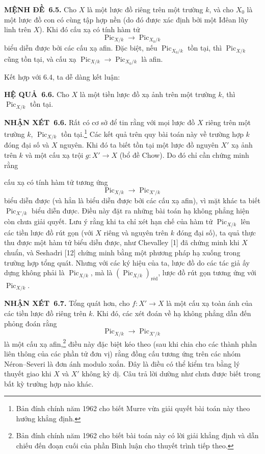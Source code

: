 \documentclass[11pt,twoside,openany]{book}
\numberwithin{equation}{section}
\newcommand{\src}[1]{%
  \phantomsection\hypertarget{src:\fgasourceid:#1}{}%
  \marginpar{\raggedleft\footnotesize\sffamily #1}%
}
\newcommand{\fgasourceid}{unset}
\newcommand{\result}[2]{\par\medskip\noindent\textbf{#1\if\relax\detokenize{#2}\relax\else\ #2\fi.}\quad}
\begin{document}
\result{MỆNH ĐỀ}{6.5} Cho $X$ là một lược đồ riêng trên một trường $k$, và cho
$X_0$ là một lược đồ con có cùng tập hợp nền (do đó được xác định bởi một Iđêan
lũy linh trên $X$). Khi đó cấu xạ có tính hàm tử
\[
\operatorname{Pic}_{X/k}\longrightarrow\operatorname{Pic}_{X_0/k}
\]
biểu diễn được bởi các cấu xạ afin. Đặc biệt, nếu
$\operatorname{Pic}_{X_0/k}$ tồn tại, thì $\operatorname{Pic}_{X/k}$ cũng tồn
tại, và cấu xạ
$\operatorname{Pic}_{X/k}\longrightarrow\operatorname{Pic}_{X_0/k}$ là afin.

Kết hợp với 6.4, ta dễ dàng kết luận:

\result{HỆ QUẢ}{6.6} Cho $X$ là một tiền lược đồ xạ ảnh trên một trường $k$,
thì $\operatorname{Pic}_{X/k}$ tồn tại.

\result{NHẬN XÉT}{6.6} Rất có cơ sở để tin rằng với mọi lược đồ $X$ riêng trên
một trường $k$, $\operatorname{Pic}_{X/k}$ tồn tại.\footnote{Bản đính chính năm
1962 cho biết Murre vừa giải quyết bài toán này theo hướng khẳng định.} Các kết quả trên
quy bài toán này về trường hợp $k$ đóng đại số và $X$ nguyên. Khi đó ta biết
tồn tại một lược đồ nguyên $X'$ xạ ảnh trên $k$ và một cấu xạ trội
$g:X'\longrightarrow X$ (bổ đề Chow). Do đó chỉ cần chứng minh rằng
\src{160}
cấu xạ có tính hàm tử tương ứng
\[
\operatorname{Pic}_{X/k}\longrightarrow\operatorname{Pic}_{X'/k}
\]
biểu diễn được (và hẳn là biểu diễn được bởi các cấu xạ afin), vì mặt khác ta
biết $\operatorname{Pic}_{X'/k}$ biểu diễn được. Điều này đặt ra những bài toán
hạ không phẳng hiện còn chưa giải quyết. Lưu ý rằng khi ta chỉ xét hạn chế của
hàm tử $\operatorname{Pic}_{X/k}$ lên các tiền lược đồ rút gọn (với $X$ riêng
và nguyên trên $k$ đóng đại số), ta quả thực thu được một hàm tử biểu diễn
được, như Chevalley [1] đã chứng minh khi $X$ chuẩn, và Seshadri [12] chứng minh
bằng một phương pháp hạ xuống trong trường hợp tổng quát. Nhưng với các ký hiệu
của ta, lược đồ do các tác giả ấy dựng không phải là
$\operatorname{Pic}_{X/k}$, mà là
$(\operatorname{Pic}_{X/k})_{\mathrm{réd}}$, lược đồ rút gọn tương ứng với
$\operatorname{Pic}_{X/k}$.

\result{NHẬN XÉT}{6.7} Tổng quát hơn, cho $f:X'\longrightarrow X$ là một cấu
xạ toàn ánh của các tiền lược đồ riêng trên $k$. Khi đó, các xét đoán về hạ
không phẳng dẫn đến phỏng đoán rằng
\[
\operatorname{Pic}_{X/k}\longrightarrow\operatorname{Pic}_{X'/k}
\]
là một cấu xạ afin,\footnote{Bản đính chính năm 1962 cho biết bài toán này có
lời giải khẳng định và dẫn chiếu đến đoạn cuối của phần Bình luận cho thuyết trình
tiếp theo.} điều này đặc biệt kéo theo (sau khi chia cho các thành phần liên
thông của các phần tử đơn vị) rằng đồng cấu tương ứng trên các nhóm
Néron--Severi là đơn ánh modulo xoắn. Đây là điều có thể kiểm tra bằng lý thuyết
giao khi $X$ và $X'$ không kỳ dị. Câu trả lời dường như chưa được biết trong
bất kỳ trường hợp nào khác.
\end{document}

